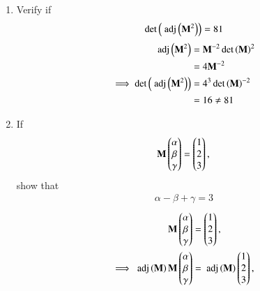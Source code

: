\documentclass[journal,12pt,twocolumn]{IEEEtran}
\renewcommand\thesection{\arabic{section}}
\begin{document}
\begin{enumerate}[label=\thesection.\arabic*
,ref=\thesection.\theenumi]
\begin{multline}
\\
= {\vec{M}^{-1}}{\det\brak{\vec{M}}}+\frac{\vec{M}}{\det\brak{\vec{M}}}
\\
= \text{ adj}\brak{\vec{M}}+\frac{\vec{M}}{\det\brak{\vec{M}}}
\end{multline}
From \eqref{eq:adj_Minv}
\begin{align}
\myvec{0 & 1 & a } 
 \myvec{-1 \\ 8 \\ -5} &= \det\brak{\vec{M}}
\\
\implies \det\brak{\vec{M}} = 8-5a &= -2
\end{align}
If
\begin{align*}
\brak{\text{ adj}\brak{\vec{M}^{-1}}} + \text{ adj}\brak{\vec{M}^{-1}}
&= -\vec{M},
\\
\text{ adj}\brak{\vec{M}}-\frac{\vec{M}}{2} &=  -\vec{M}
\\
\implies \vec{M} &= - \text{ adj}\brak{\vec{M}}
\end{align*}
%
which is incorrect.
\item Verify if
\begin{align}
\det\left(\text{ adj}\left(\mathbf{M}^2\right)\right)  = 81
\end{align}
\solution 
\begin{align}
\text{ adj}\left(\mathbf{M}^2\right)  &= \mathbf{M}^{-2}\det\left(\mathbf{M}\right)^{2}
\\
&= 4{\mathbf{M}^{-2}}
\\
\implies \det\left(\text{ adj}\left(\mathbf{M}^2\right)\right)  &= 4^3\det\left(\mathbf{M}\right)^{-2}
\\
&= 16 \ne 81
\end{align}
%
\item If 
\begin{align}
\mathbf{M}\begin{pmatrix}\alpha \\ \beta \\ \gamma\end{pmatrix}  = \begin{pmatrix}1 \\ 2 \\ 3\end{pmatrix}, 
\end{align}
show that 
\begin{align}
\alpha - \beta + \gamma = 3
\end{align}
\solution 
\begin{align}
\vec{M}\myvec{\alpha \\ \beta \\ \gamma}  &= \myvec{1 \\ 2 \\ 3}, 
\\
\implies \text{ adj}\brak{\vec{M}}\vec{M}\myvec{\alpha \\ \beta \\ \gamma}  &= \text{ adj}\brak{\vec{M}}\myvec{1 \\ 2 \\ 3}, 

\end{align}
\end{enumerate}
\end{document}
